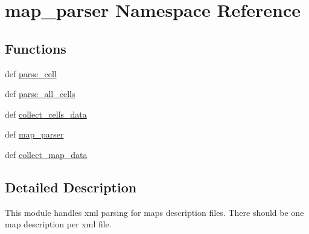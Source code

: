 \hypertarget{namespacemap__parser}{\section{map\-\_\-parser \-Namespace \-Reference}
\label{namespacemap__parser}
}
\subsection*{\-Functions}
\begin{DoxyCompactItemize}
\item 
def \hyperlink{namespacemap__parser_a00ad0e89a74d4dc447b599e8e9b60e65}{parse\-\_\-cell}
\item 
def \hyperlink{namespacemap__parser_a8bf79bde0244367adb3cc7a302e4af47}{parse\-\_\-all\-\_\-cells}
\item 
def \hyperlink{namespacemap__parser_a2f03ea0729eb1e421f4d986e9c18519e}{collect\-\_\-cells\-\_\-data}
\item 
def \hyperlink{namespacemap__parser_a4837b9f41f6ac6916382277c63ed2e29}{map\-\_\-parser}
\item 
def \hyperlink{namespacemap__parser_af1a1612af86e8bf74604bc25b335e055}{collect\-\_\-map\-\_\-data}
\end{DoxyCompactItemize}


\subsection{\-Detailed \-Description}
\begin{DoxyVerb}
This module handles xml parsing for maps description files.
There should be one map description per xml file.
\end{DoxyVerb}
 


